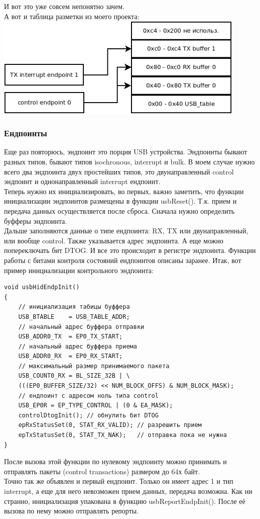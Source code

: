 \documentclass[12pt,a4paper]{article}
\begin{document}
    И вот это уже совсем непонятно зачем.\\
    А вот и таблица разметки из моего проекта:\\
\includegraphics[width=12cm]{table.png}\\


\subsubsection{Ендпоинты}
    Еще раз повторюсь, эндпоинт это порция USB устройства. Эндпоинты бывают
    разных типов, бывают типов isochronous, interrupt и bulk. В моем случае
    нужно всего два эндпоинта двух простейших типов, это двунаправленный
    control эндпоинт и однонаправленный interrupt ендпоинт.\\
    Теперь нужно их инициализировать, во первых, важно заметить, что
    функции инициализации эндпоинтов размещены в функции usbReset(). Т.к.
    прием и передача данных осуществляется после сброса. Сначала нужно
    определить буфферы эндпоинта.\\
    Дальше заполняются данные о типе ендпоинта:
    RX, TX или двунаправленный, или вообще control. Также указывается адрес
    эндпоинта.
    А еще можно попереключать бит DTOG. И все это происходит в регистре
    эндпоинта. Функции работы с битами контроля состояний ендпоинтов описаны
    заранее. Итак, вот
    пример инициализации контрольного эндпоинта:
\lstset{language=c}
\begin{lstlisting}
void usbHidEndpInit()
{
    // инициализация табицы буффера
    USB_BTABLE    = USB_TABLE_ADDR;
    // начальный адрес буффера отправки
    USB_ADDR0_TX  = EP0_TX_START;
    // начальный адрес буффера приема
    USB_ADDR0_RX  = EP0_RX_START;
    // максимальный размер принимаемого пакета
    USB_COUNT0_RX = BL_SIZE_32B | \
    (((EP0_BUFFER_SIZE/32) << NUM_BLOCK_OFFS) & NUM_BLOCK_MASK);
    // ендпоинт с адресом ноль типа control
    USB_EP0R = EP_TYPE_CONTROL | (0 & EA_MASK);
    controlDtogInit(); // обнулить бит DTOG
    epRxStatusSet(0, STAT_RX_VALID); // разрешить прием
    epTxStatusSet(0, STAT_TX_NAK);   // отправка пока не нужна
}
\end{lstlisting}
    После вызова этой функции по нулевому эндпоинту можно принимать и
    отправлять пакеты (control transactions) размером до 64х байт.\\
    Точно так же объявлен и первый ендпоинт. Только он имеет адрес 1 и тип
    interrupt, а еще для него невозможен прием данных, передача возможна. Как
    ни странно, инициализация упакована в функцию usbReportEndpInit().
    После её вызова по нему можно отправлять репорты.
\end{document}
